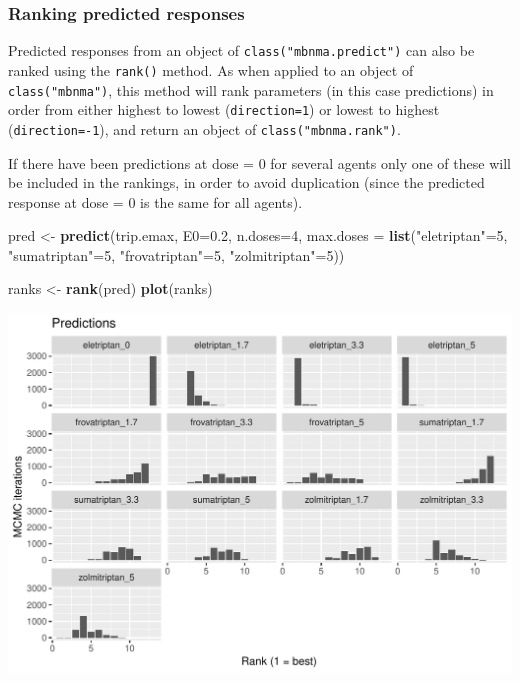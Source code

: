 \documentclass[]{article}
\newenvironment{Shaded}{\begin{snugshade}}{\end{snugshade}}
\newcommand{\DataTypeTok}[1]{\textcolor[rgb]{0.13,0.29,0.53}{#1}}
\newcommand{\DecValTok}[1]{\textcolor[rgb]{0.00,0.00,0.81}{#1}}
\newcommand{\FloatTok}[1]{\textcolor[rgb]{0.00,0.00,0.81}{#1}}
\newcommand{\KeywordTok}[1]{\textcolor[rgb]{0.13,0.29,0.53}{\textbf{#1}}}
\newcommand{\NormalTok}[1]{#1}
\newcommand{\StringTok}[1]{\textcolor[rgb]{0.31,0.60,0.02}{#1}}
\begin{document}
\hypertarget{ranking-predicted-responses}{%
\subsubsection{Ranking predicted
responses}\label{ranking-predicted-responses}}

Predicted responses from an object of \texttt{class("mbnma.predict")}
can also be ranked using the \texttt{rank()} method. As when applied to
an object of \texttt{class("mbnma")}, this method will rank parameters
(in this case predictions) in order from either highest to lowest
(\texttt{direction=1}) or lowest to highest (\texttt{direction=-1}), and
return an object of \texttt{class("mbnma.rank")}.

If there have been predictions at dose = 0 for several agents only one
of these will be included in the rankings, in order to avoid duplication
(since the predicted response at dose = 0 is the same for all agents).

\begin{Shaded}
\begin{Highlighting}[]
\NormalTok{pred <-}\StringTok{ }\KeywordTok{predict}\NormalTok{(trip.emax, }\DataTypeTok{E0=}\FloatTok{0.2}\NormalTok{, }\DataTypeTok{n.doses=}\DecValTok{4}\NormalTok{,}
                \DataTypeTok{max.doses =} \KeywordTok{list}\NormalTok{(}\StringTok{"eletriptan"}\NormalTok{=}\DecValTok{5}\NormalTok{, }\StringTok{"sumatriptan"}\NormalTok{=}\DecValTok{5}\NormalTok{, }
                              \StringTok{"frovatriptan"}\NormalTok{=}\DecValTok{5}\NormalTok{, }\StringTok{"zolmitriptan"}\NormalTok{=}\DecValTok{5}\NormalTok{))}

\NormalTok{ranks <-}\StringTok{ }\KeywordTok{rank}\NormalTok{(pred)}
\KeywordTok{plot}\NormalTok{(ranks)}
\end{Highlighting}
\end{Shaded}

\includegraphics{mbnmadose_files/figure-latex/unnamed-chunk-46-1.pdf}
\end{document}
